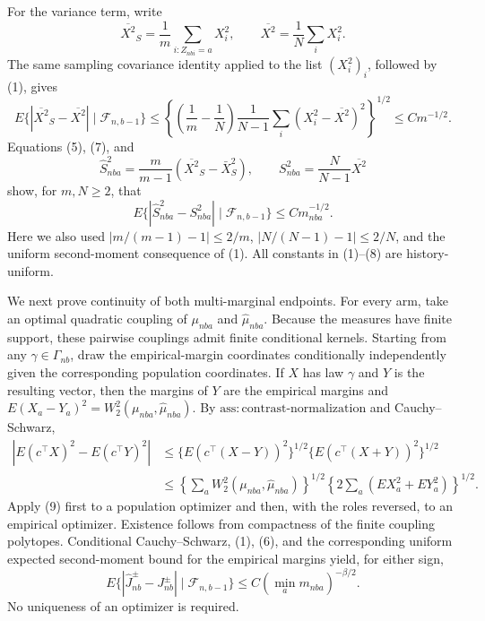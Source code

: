 For the variance term, write
\[
\overline{X^2}_S=\frac1m\sum_{i:Z_{nbi}=a}X_i^2,
\qquad
\overline{X^2}=\frac1N\sum_iX_i^2.
\]
The same sampling covariance identity applied to the list \((X_i^2)_i\), followed by (1), gives
\[
E\{|\overline{X^2}_S-\overline{X^2}|\mid\mathcal F_{n,b-1}\}
\le\left\{\left(\frac1m-\frac1N\right)
\frac1{N-1}\sum_i(X_i^2-\overline{X^2})^2\right\}^{1/2}
\le Cm^{-1/2}.
\tag{7}
\]
Equations (5), (7), and
\[
\widehat S_{nba}^2=\frac{m}{m-1}(\overline{X^2}_S-\bar X_S^2),
\qquad
S_{nba}^2=\frac{N}{N-1}\overline{X^2}
\]
show, for \(m,N\ge2\), that
\[
E\{|\widehat S_{nba}^2-S_{nba}^2|\mid\mathcal F_{n,b-1}\}
\le Cm_{nba}^{-1/2}.
\tag{8}
\]
Here we also used \(|m/(m-1)-1|\le2/m\), \(|N/(N-1)-1|\le2/N\), and the uniform second-moment consequence of (1). All constants in (1)--(8) are history-uniform.

We next prove continuity of both multi-marginal endpoints. For every arm, take an optimal quadratic coupling of \(\mu_{nba}\) and \(\widehat\mu_{nba}\). Because the measures have finite support, these pairwise couplings admit finite conditional kernels. Starting from any \(\gamma\in\Gamma_{nb}\), draw the empirical-margin coordinates conditionally independently given the corresponding population coordinates. If \(X\) has law \(\gamma\) and \(Y\) is the resulting vector, then the margins of \(Y\) are the empirical margins and
\(E(X_a-Y_a)^2=W_2^2(\mu_{nba},\widehat\mu_{nba})\). By \(\mathrm{ass:contrast\text{-}normalization}\) and Cauchy--Schwarz,
\[
\begin{aligned}
|E(c^\top X)^2-E(c^\top Y)^2|
&\le\{E(c^\top(X-Y))^2\}^{1/2}
\{E(c^\top(X+Y))^2\}^{1/2}\\
&\le\left\{\sum_aW_2^2(\mu_{nba},\widehat\mu_{nba})\right\}^{1/2}
\left\{2\sum_a(EX_a^2+EY_a^2)\right\}^{1/2}.
\end{aligned}
\tag{9}
\]
Apply (9) first to a population optimizer and then, with the roles reversed, to an empirical optimizer. Existence follows from compactness of the finite coupling polytopes. Conditional Cauchy--Schwarz, (1), (6), and the corresponding uniform expected second-moment bound for the empirical margins yield, for either sign,
\[
E\{|\widehat J_{nb}^{\pm}-J_{nb}^{\pm}|\mid\mathcal F_{n,b-1}\}
\le C\left(\min_a m_{nba}\right)^{-\beta/2}.
\tag{10}
\]
No uniqueness of an optimizer is required.

